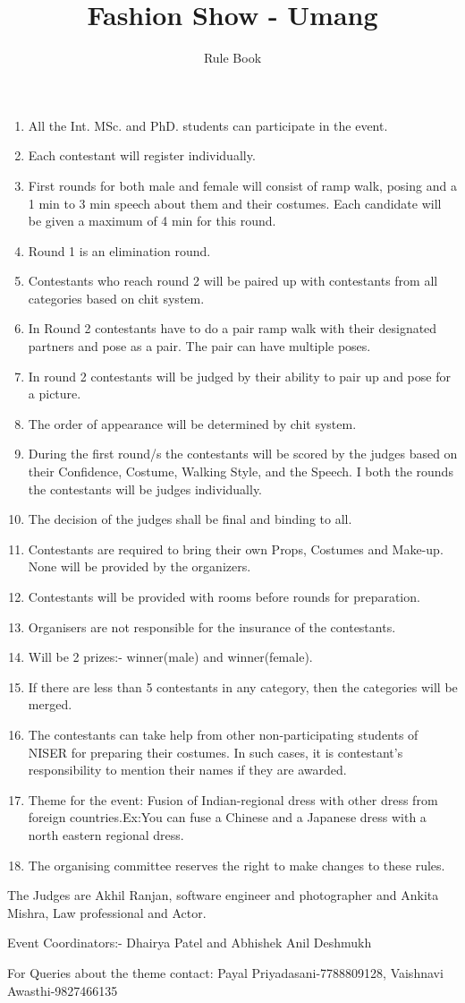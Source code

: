 \documentclass[a4paper, 11pt]{proc}
\begin{document}
\title{Fashion Show - Umang}
\author{Rule Book}
\maketitle
\begin{enumerate}
	\item All the Int. MSc. and PhD. students can participate in the event.
	\item Each contestant will register individually.
	\item First rounds for both male and female will consist of ramp walk, posing and a 1 min to 3 min speech about them and their costumes. Each candidate will be given a maximum of 4 min for this round.
	\item Round 1 is an elimination round.
	\item Contestants who reach round 2 will be paired up with contestants from all categories based on chit system.
	\item In Round 2 contestants have to do a pair ramp walk with their designated partners and pose as a pair. The pair can have multiple poses.
	\item In round 2 contestants will be judged by their ability to pair up and pose for a picture.
	\item The order of appearance will be determined by chit system.
	\item During the first round/s the contestants will be scored by the judges based on their Confidence, Costume, Walking Style, and the Speech. I both the rounds the contestants will be judges individually.
	\item The decision of the judges shall be final and binding to all.
	\item Contestants are required to bring their own Props, Costumes and Make-up. None will be provided by the organizers.
	\item Contestants will be provided with rooms before rounds for preparation.
	\item Organisers are not responsible for the insurance of the contestants.
	\item Will be 2 prizes:- winner(male) and winner(female).
	\item If there are less than 5 contestants in any category, then the categories will be merged.
	\item The contestants can take help from other non-participating students of NISER for preparing their costumes. In such cases, it is contestant's responsibility to mention their names if they are awarded.
	\item Theme for the event: Fusion of Indian-regional dress with other dress from foreign countries.Ex:You can fuse a Chinese and a Japanese dress with a north eastern regional dress.
	\item The organising committee reserves the right to make changes to these rules.
\end{enumerate}
The Judges are Akhil Ranjan, software engineer and photographer and Ankita Mishra, Law professional and Actor.

Event Coordinators:- Dhairya Patel and Abhishek Anil Deshmukh

For Queries about the theme contact: Payal Priyadasani-7788809128, Vaishnavi Awasthi-9827466135
\end{document}

